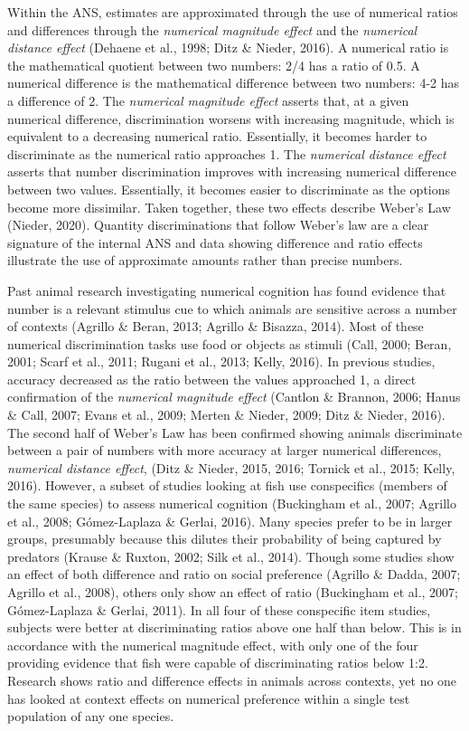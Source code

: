 \documentclass[
  ,doc,floatsintext]{apa6}
\begin{document}
Within the ANS, estimates are approximated through the use of numerical ratios and differences through the \emph{numerical magnitude effect} and the \emph{numerical distance effect} (Dehaene et al., 1998; Ditz \& Nieder, 2016). A numerical ratio is the mathematical quotient between two numbers: 2/4 has a ratio of 0.5. A numerical difference is the mathematical difference between two numbers: 4-2 has a difference of 2. The \emph{numerical magnitude effect} asserts that, at a given numerical difference, discrimination worsens with increasing magnitude, which is equivalent to a decreasing numerical ratio. Essentially, it becomes harder to discriminate as the numerical ratio approaches 1. The \emph{numerical distance effect} asserts that number discrimination improves with increasing numerical difference between two values. Essentially, it becomes easier to discriminate as the options become more dissimilar. Taken together, these two effects describe Weber's Law (Nieder, 2020). Quantity discriminations that follow Weber's law are a clear signature of the internal ANS and data showing difference and ratio effects illustrate the use of approximate amounts rather than precise numbers.

Past animal research investigating numerical cognition has found evidence that number is a relevant stimulus cue to which animals are sensitive across a number of contexts (Agrillo \& Beran, 2013; Agrillo \& Bisazza, 2014). Most of these numerical discrimination tasks use food or objects as stimuli (Call, 2000; Beran, 2001; Scarf et al., 2011; Rugani et al., 2013; Kelly, 2016). In previous studies, accuracy decreased as the ratio between the values approached 1, a direct confirmation of the \emph{numerical magnitude effect} (Cantlon \& Brannon, 2006; Hanus \& Call, 2007; Evans et al., 2009; Merten \& Nieder, 2009; Ditz \& Nieder, 2016). The second half of Weber's Law has been confirmed showing animals discriminate between a pair of numbers with more accuracy at larger numerical differences, \emph{numerical distance effect}, (Ditz \& Nieder, 2015, 2016; Tornick et al., 2015; Kelly, 2016). However, a subset of studies looking at fish use conspecifics (members of the same species) to assess numerical cognition (Buckingham et al., 2007; Agrillo et al., 2008; Gómez-Laplaza \& Gerlai, 2016). Many species prefer to be in larger groups, presumably because this dilutes their probability of being captured by predators (Krause \& Ruxton, 2002; Silk et al., 2014). Though some studies show an effect of both difference and ratio on social preference (Agrillo \& Dadda, 2007; Agrillo et al., 2008), others only show an effect of ratio (Buckingham et al., 2007; Gómez-Laplaza \& Gerlai, 2011). In all four of these conspecific item studies, subjects were better at discriminating ratios above one half than below. This is in accordance with the numerical magnitude effect, with only one of the four providing evidence that fish were capable of discriminating ratios below 1:2. Research shows ratio and difference effects in animals across contexts, yet no one has looked at context effects on numerical preference within a single test population of any one species.
\end{document}
